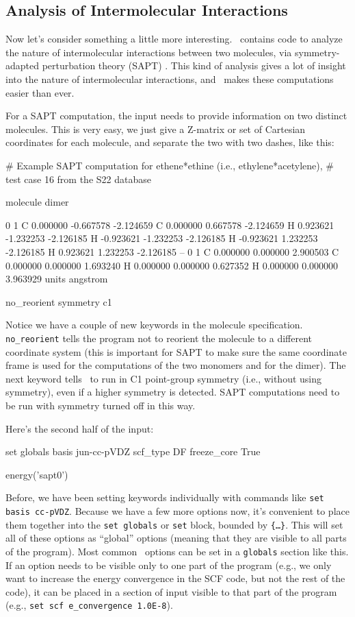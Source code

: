 \subsection{Analysis of Intermolecular Interactions}
Now let's consider something a little more interesting.  \PSIfour\
contains code to analyze the nature of intermolecular interactions
between two molecules, via symmetry-adapted perturbation theory
(SAPT) \cite{Jeziorski:1994:1887}.  This kind of analysis gives a lot
of insight into the nature of intermolecular interactions, and \PSIfour\
makes these computations easier than ever.

For a SAPT computation, the input needs to provide information on two
distinct molecules.  This is very easy, we just give a Z-matrix or set of
Cartesian coordinates for each molecule, and separate the two with two
dashes, like this:
\begin{Snippet}
# Example SAPT computation for ethene*ethine (i.e., ethylene*acetylene),
# test case 16 from the S22 database

molecule dimer {
0 1
C   0.000000  -0.667578  -2.124659
C   0.000000   0.667578  -2.124659
H   0.923621  -1.232253  -2.126185
H  -0.923621  -1.232253  -2.126185
H  -0.923621   1.232253  -2.126185
H   0.923621   1.232253  -2.126185
--
0 1
C   0.000000   0.000000   2.900503
C   0.000000   0.000000   1.693240
H   0.000000   0.000000   0.627352
H   0.000000   0.000000   3.963929
units angstrom

no_reorient
symmetry c1
}
\end{Snippet}

Notice we have a couple of new keywords in the molecule specification.
{\tt no\_reorient} tells the program not to reorient the molecule
to a different coordinate system (this is important for SAPT to make
sure the same coordinate frame is used for the computations of the two
monomers and for the dimer).  The next keyword tells \PSIfour\ to run
in C1 point-group symmetry (i.e., without using symmetry), even if a
higher symmetry is detected.  SAPT computations need to be run with
symmetry turned off in this way.

Here's the second half of the input:
\begin{Snippet}
set globals {
    basis jun-cc-pVDZ
    scf_type DF
    freeze_core True
}

energy('sapt0')
\end{Snippet}

Before, we have been setting keywords individually with commands like 
{\tt set basis cc-pVDZ}.  Because we have a few more options now, it's
convenient to place them together into the {\tt set globals} or {\tt set}
block, bounded by {\tt \{\dots\}}.  This
will set all of these options as ``global'' options (meaning that they are
visible to all parts of the program).  Most common \PSIfour\ options can be
set in a {\tt globals} section like this.  If an option needs to be visible
only to one part of the program (e.g., we only want to increase the
energy convergence in the SCF code, but not the rest of the
code), it can be placed in a section of input visible to that part of the
program (e.g., {\tt set scf e\_convergence 1.0E-8}).

